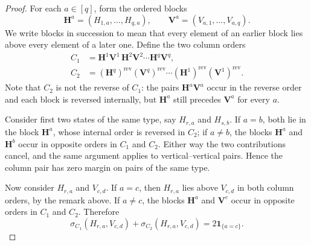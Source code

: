 \documentclass[12pt]{article}
\theoremstyle{remark}
\newcommand{\one}{\mathbf{1}}
\newcommand{\rev}{\mathrm{rev}}
\begin{document}
\begin{proof}
For each $a\in[q]$, form the ordered blocks
\[
  \mathbf H^a=(H_{1,a},\ldots,H_{q,a}),
  \qquad
  \mathbf V^a=(V_{a,1},\ldots,V_{a,q}).
\]
We write blocks in succession to mean that every element of an earlier block lies above every element of a later one. Define the two column orders
\begin{align*}
  C_1&=\mathbf H^1\mathbf V^1\,
       \mathbf H^2\mathbf V^2\cdots
       \mathbf H^q\mathbf V^q,\\
  C_2&=(\mathbf H^q)^{\rev}(\mathbf V^q)^{\rev}\cdots
       (\mathbf H^1)^{\rev}(\mathbf V^1)^{\rev}.
\end{align*}
Note that $C_2$ is not the reverse of $C_1$: the pairs $\mathbf H^a\mathbf V^a$ occur in the reverse order and each block is
reversed internally, but $\mathbf H^a$ still precedes $\mathbf V^a$ for every $a$.

Consider first two states of the same type, say $H_{r,a}$ and
$H_{s,b}$.  If $a=b$, both lie in the block $\mathbf H^a$, whose
internal order is reversed in $C_2$; if $a\ne b$, the blocks
$\mathbf H^a$ and $\mathbf H^b$ occur in opposite orders in $C_1$ and $C_2$.  Either way the two contributions cancel, and the same argument
applies to vertical--vertical pairs. Hence the column pair has zero
margin on pairs of the same type.

Now consider $H_{r,a}$ and $V_{c,d}$.  If $a=c$, then $H_{r,a}$ lies above $V_{c,d}$ in both column orders, by the remark above.  If
$a\ne c$, the blocks $\mathbf H^a$ and $\mathbf V^c$ occur in opposite orders in $C_1$ and $C_2$.  Therefore
\begin{equation}\label{eq:column-pair}
  \sigma_{C_1}(H_{r,a},V_{c,d})+
  \sigma_{C_2}(H_{r,a},V_{c,d})
  =2\one_{\{a=c\}}.
\end{equation}


\end{proof}
\end{document}
